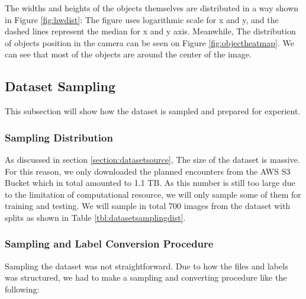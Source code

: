   The widths and heights of the objects themselves are distributed in a way shown in Figure \ref{fig:hwdist}:
  The figure uses logarithmic scale for x and y, and the dashed lines represent the median for x and y axis.
  Meanwhile, The distribution of objects position in the camera can be seen on Figure \ref{fig:objectheatmap}.
  We can see that most of the objects are around the center of the image.





  \subsection{Dataset Sampling}
  \label{section:datasetsampling}
  This subsection will show how the dataset is sampled and prepared for experient. 
    \subsubsection{Sampling Distribution}
    As discussed in section \ref{section:datasetsource}, The size of the dataset is massive.
    For this reason, we only downloaded the planned encounters from the AWS S3 Bucket which 
    in total amounted to 1.1 TB. As this number is still too large
    due to the limitation of computational resource, we will only sample some of them
    for training and testing. We will sample in total 700 images from the dataset with splits
    as shown in Table \ref{tbl:datasetsamplingdist}.
    \begin{table}
      \centering
      \label{tbl:datasetsamplingdist}
      
    \end{table}
    
    \subsubsection{Sampling and Label Conversion Procedure}
    Sampling the dataset was not straightforward. Due to how the \textcite{aot_dataset} files and labels was structured,
    we had to make a sampling and converting procedure like the following:

